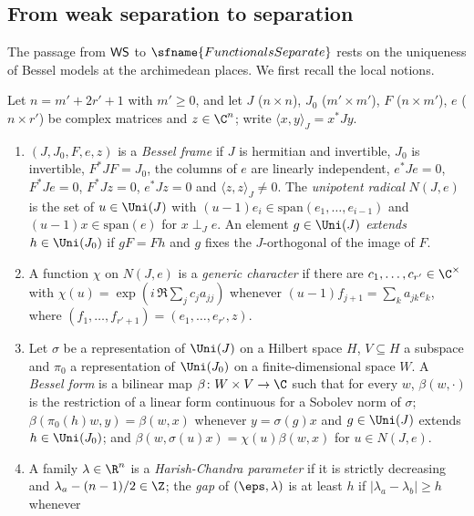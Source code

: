 \subsection{From weak separation to separation}\label{sec:pf:fs:bessel}

The passage from $\mathsf{WS}$ to $\sfname{FunctionalsSeparate}$ rests on the uniqueness of Bessel models at the archimedean
places. We first recall the local notions.

\begin{definition}\label{pf:fs:besselforms}
Let $n=m'+2r'+1$ with $m'\ge0$, and let $J$ ($n\times n$), $J_0$ ($m'\times m'$), $F$ ($n\times m'$), $e$ ($n\times r'$) be complex
matrices and $z\in\C^n$; write $\langle x,y\rangle_J=x^*Jy$.
\begin{enumerate}[label=(\alph*)]
\item $(J,J_0,F,e,z)$ is a \emph{Bessel frame} if $J$ is hermitian and invertible, $J_0$ is invertible, $F^*JF=J_0$, the columns of $e$
are linearly independent, $e^*Je=0$, $F^*Je=0$, $F^*Jz=0$, $e^*Jz=0$ and $\langle z,z\rangle_J\neq0$. The \emph{unipotent radical}
$N(J,e)$ is the set of $u\in\Uni(J)$ with $(u-1)e_i\in\mathrm{span}(e_1,\dots,e_{i-1})$ and $(u-1)x\in\mathrm{span}(e)$ for
$x\perp_J e$. An element $g\in\Uni(J)$ \emph{extends} $h\in\Uni(J_0)$ if $gF=Fh$ and $g$ fixes the $J$-orthogonal of the
image of $F$.
\item A function $\chi$ on $N(J,e)$ is a \emph{generic character} if there are $c_1,\dots,c_{r'}\in\C^\times$ with
$\chi(u)=\exp(i\,\Re\sum_jc_ja_{jj})$ whenever $(u-1)f_{j+1}=\sum_ka_{jk}e_k$, where $(f_1,\dots,f_{r'+1})=(e_1,\dots,e_{r'},z)$.
\item Let $\sigma$ be a representation of $\Uni(J)$ on a Hilbert space $H$, $V\subseteq H$ a subspace and $\pi_0$ a
representation of $\Uni(J_0)$ on a finite-dimensional space $W$. A \emph{Bessel form} is a bilinear map
$\beta\colon W\times V\to\C$ such that for every $w$, $\beta(w,\cdot)$ is the restriction of a linear form continuous for a
Sobolev norm of $\sigma$; $\beta(\pi_0(h)w,y)=\beta(w,x)$ whenever $y=\sigma(g)x$ and $g\in\Uni(J)$ extends $h\in\Uni(J_0)$; and
$\beta(w,\sigma(u)x)=\chi(u)\beta(w,x)$ for $u\in N(J,e)$.
\item A family $\lambda\in\R^n$ is a \emph{Harish-Chandra parameter} if it is strictly decreasing and
$\lambda_a-(n-1)/2\in\Z$; the \emph{gap} of $(\eps,\lambda)$ is at least $h$ if $|\lambda_a-\lambda_b|\ge h$ whenever

\end{enumerate}
\end{definition}
